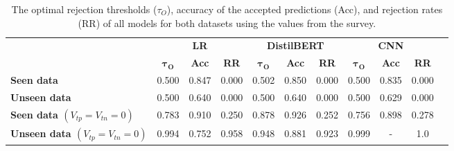 \begin{table}
    \scriptsize
    \centering
    \setlength\tabcolsep{5pt}
    \begin{tabular}{lcccccccccc}
        \toprule
                                                 & \multicolumn{3}{c}{\textbf{LR}} & \multicolumn{3}{c}{\textbf{DistilBERT}} & \multicolumn{3}{c}{\textbf{CNN}}                                                                                                           \\
        \cmidrule(l){2-4} \cmidrule(l){5-7} \cmidrule(l){8-10}
                                                 & $\boldsymbol{\tau_O}$           & \textbf{Acc}                            & \textbf{RR}                      & $\boldsymbol{\tau_O}$ & \textbf{Acc} & \textbf{RR} & $\boldsymbol{\tau_O}$ & \textbf{Acc} & \textbf{RR} \\
        \midrule
        \textbf{Seen data}                       & 0.500                           & 0.847                                   & 0.000                            & 0.502                 & 0.850        & 0.000       & 0.500                 & 0.835        & 0.000       \\
        \textbf{Unseen data}                     & 0.500                           & 0.640                                   & 0.000                            & 0.500                 & 0.640        & 0.000       & 0.500                 & 0.629        & 0.000       \\
        \midrule
        \textbf{Seen data $(V_{tp}=V_{tn}=0)$}   & 0.783                           & 0.910                                   & 0.250                            & 0.878                 & 0.926        & 0.252       & 0.756                 & 0.898        & 0.278       \\
        \textbf{Unseen data $(V_{tp}=V_{tn}=0)$} & 0.994                           & 0.752                                   & 0.958                            & 0.948                 & 0.881        & 0.923       & 0.999                 & -            & 1.0         \\
        \bottomrule
    \end{tabular}
    \caption{The optimal rejection thresholds ($\tau_O$), accuracy of the accepted predictions (Acc), and rejection rates (RR) of all models for both datasets using the values from the survey.}
    \label{tab:metric}
\end{table}

